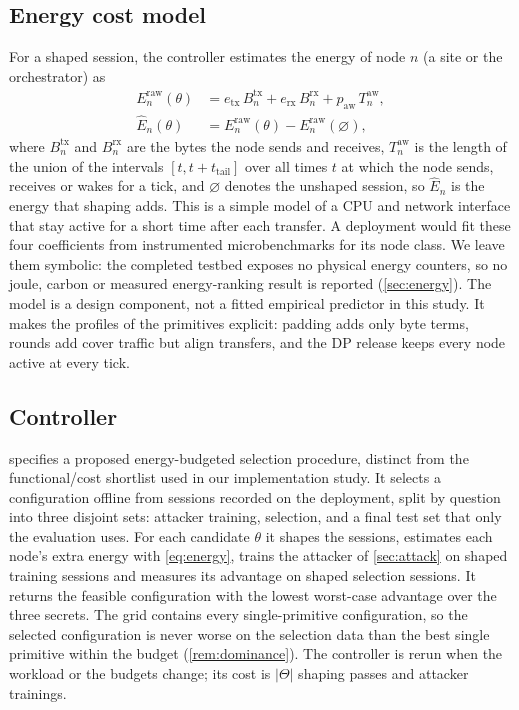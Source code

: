 \subsection{Energy cost model}
For a shaped session, the controller estimates the energy of node $n$ (a site or the orchestrator) as
\begin{equation}\label{eq:energy}
\begin{aligned}
E^{\mathrm{raw}}_n(\theta)&=e_{\mathrm{tx}}\,B^{\mathrm{tx}}_n+e_{\mathrm{rx}}\,B^{\mathrm{rx}}_n+p_{\mathrm{aw}}\,T^{\mathrm{aw}}_n,\\
\hat E_n(\theta)&=E^{\mathrm{raw}}_n(\theta)-E^{\mathrm{raw}}_n(\varnothing),
\end{aligned}
\end{equation}
where $B^{\mathrm{tx}}_n$ and $B^{\mathrm{rx}}_n$ are the bytes the node sends and receives, $T^{\mathrm{aw}}_n$ is the length of the union of the intervals $[t,t+t_{\mathrm{tail}}]$ over all times $t$ at which the node sends, receives or wakes for a tick, and $\varnothing$ denotes the unshaped session, so $\hat E_n$ is the energy that shaping adds. This is a simple model of a CPU and network interface that stay active for a short time after each transfer. A deployment would fit these four coefficients from instrumented microbenchmarks for its node class. We leave them symbolic: the completed testbed exposes no physical energy counters, so no joule, carbon or measured energy-ranking result is reported (\cref{sec:energy}). The model is a design component, not a fitted empirical predictor in this study. It makes the profiles of the primitives explicit: padding adds only byte terms, rounds add cover traffic but align transfers, and the DP release keeps every node active at every tick.

\subsection{Controller}
 specifies a proposed energy-budgeted selection procedure, distinct from the functional/cost shortlist used in our implementation study. It selects a configuration offline from sessions recorded on the deployment, split by question into three disjoint sets: attacker training, selection, and a final test set that only the evaluation uses. For each candidate $\theta$ it shapes the sessions, estimates each node's extra energy with \cref{eq:energy}, trains the attacker of \cref{sec:attack} on shaped training sessions and measures its advantage on shaped selection sessions. It returns the feasible configuration with the lowest worst-case advantage over the three secrets. The grid contains every single-primitive configuration, so the selected configuration is never worse on the selection data than the best single primitive within the budget (\cref{rem:dominance}). The controller is rerun when the workload or the budgets change; its cost is $|\Theta|$ shaping passes and attacker trainings.

